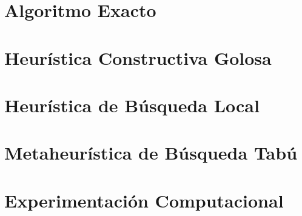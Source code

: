 \documentclass[11pt, a4paper, spanish]{article}
\begin{document}
    \section{Algoritmo Exacto\label{backtracking}}
        
        \pagebreak

    \section{Heur\'istica Constructiva Golosa\label{golosa}}
        
        \pagebreak

    \section{Heur\'istica de B\'usqueda Local\label{busqueda}}
        
        \pagebreak

    \section{Metaheur\'istica de B\'usqueda Tab\'u\label{tabu}}
        
        \pagebreak

    \section{Experimentaci\'on Computacional\label{experimentacion}}
        
        \pagebreak
\end{document}
